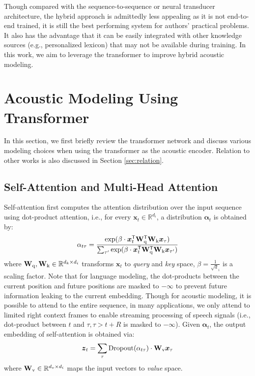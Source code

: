 \documentclass{article}
\begin{document}
Though compared with the sequence-to-sequence or neural transducer architecture, the hybrid approach is admittedly less appealing as it is 
not end-to-end trained, it is still the best performing system for authors' practical problems. It also has the advantage that it can be easily integrated with other knowledge sources (e.g., personalized lexicon) that may not be available during training. In this work, we aim to leverage the transformer to improve hybrid acoustic modeling.

\section{Acoustic Modeling Using Transformer}
\label{sec:am}
In this section, we first briefly review the transformer network and discuss various modeling choices when using the transformer as the acoustic encoder. Relation to other works is also discussed in Section \ref{sec:relation}.





\subsection{Self-Attention and Multi-Head Attention}
Self-attention first computes the attention distribution over the input sequence using dot-product attention, i.e., for every $\boldsymbol{x}_t \in \mathbb{R}^{d_i}$, a distribution $\boldsymbol{\alpha}_{t}$ is obtained by: 
\begin{align}
    \alpha_{t\tau} = \frac{
    \exp(\beta \cdot\boldsymbol{x}_t^{\sf T}\mathbf{W}_{\rm q}^{\sf T} \mathbf{W}_{\rm k}\boldsymbol{x}_\tau )
    }{
    \sum_{\tau'} \exp(\beta \cdot\boldsymbol{x}_t^{\sf T}\mathbf{W}_{\rm q}^{\sf T} \mathbf{W}_{\rm k}\boldsymbol{x}_{\tau'} )}
\end{align}
where $\mathbf{W}_{\rm q}, \mathbf{W}_{\rm k} \in \mathbb{R}^{d_k \times d_i}$ transforms $\boldsymbol{x}_t$ to 
\emph{query} and \emph{key} space, $\beta = \frac{1}{\sqrt{d}_i}$ is a scaling factor. Note that for language modeling, the dot-products between the current position and future positions are masked to $-\infty$ to prevent future information leaking to the current embedding. Though for acoustic modeling, it is possible to attend to the entire sequence, in many applications, we only attend to limited right context frames to enable streaming processing of speech signals (i.e., dot-product between $t$ and $\tau, \tau > t + R$ is masked to $-\infty$). Given $\boldsymbol{\alpha}_t$, the output embedding of self-attention is obtained via:
\begin{align}
    \boldsymbol{z}_t = \sum_{\tau} \mathrm{Dropout}(\alpha_{t\tau}) \cdot \mathbf{W}_{\rm v} \boldsymbol{x}_\tau
\end{align}
where $\mathbf{W}_{\rm v} \in \mathbb{R}^{d_v \times d_i}$ maps the input vectors to \emph{value} space.
\end{document}
